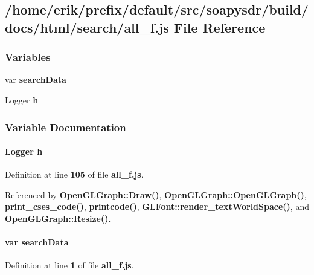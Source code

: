 \subsection{/home/erik/prefix/default/src/soapysdr/build/docs/html/search/all\+\_\+f.js File Reference}
\label{all__f_8js}
\subsubsection*{Variables}
\begin{DoxyCompactItemize}
\item 
var {\bf search\+Data}
\item 
Logger {\bf h}
\end{DoxyCompactItemize}


\subsubsection{Variable Documentation}
\paragraph[{h}]{\setlength{\rightskip}{0pt plus 5cm}Logger h}\label{all__f_8js_ae33f7a76ee9ca9a732a6a2496cc82182}


Definition at line {\bf 105} of file {\bf all\+\_\+f.\+js}.



Referenced by {\bf Open\+G\+L\+Graph\+::\+Draw()}, {\bf Open\+G\+L\+Graph\+::\+Open\+G\+L\+Graph()}, {\bf print\+\_\+cses\+\_\+code()}, {\bf printcode()}, {\bf G\+L\+Font\+::render\+\_\+text\+World\+Space()}, and {\bf Open\+G\+L\+Graph\+::\+Resize()}.

\paragraph[{search\+Data}]{\setlength{\rightskip}{0pt plus 5cm}var search\+Data}\label{all__f_8js_ad01a7523f103d6242ef9b0451861231e}


Definition at line {\bf 1} of file {\bf all\+\_\+f.\+js}.

